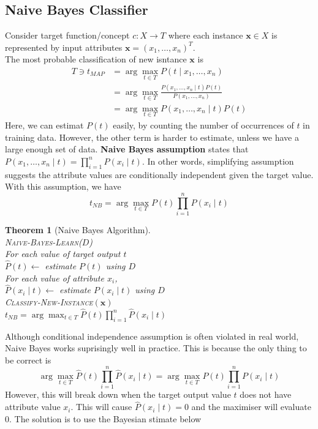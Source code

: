 \documentclass[12pt]{article}
\newcommand{\ind}{\hspace*{15pt}}
\newtheorem{theorem}{Theorem}[section]
\theoremstyle{definition}
\begin{document}
\subsection{Naive Bayes Classifier}
Consider target function/concept $c:X\to T$ where each instance $\mathbf{x}\in X$ is represented by input attributes $\mathbf{x}=(x_1,\ldots, x_n)^T$. \\
The most probable classification of new isntance $\mathbf{x}$ is
\begin{align*}
T\ni t_{MAP} &= \arg\max_{t\in T} P(t\mid x_1, \ldots, x_n)\\
&=\arg\max_{t\in T} \frac{P(x_1,\ldots, x_n\mid t)P(t)}{P(x_1, \ldots, x_n)}\\
&=\arg\max_{t\in T} P(x_1,\ldots, x_n\mid t)P(t)
\end{align*}
Here, we can estimat $P(t)$ easily, by counting the number of occurrences of $t$ in training data. However, the other term is harder to estimate, unless we have a large enough set of data.
\textbf{Naive Bayes assumption} states that $P(x_1, \ldots, x_n\mid t)=\prod_{i=1}^n P(x_i\mid t)$. In other words, simplifying assumption suggests the attribute values are conditionally independent given the target value. \\
With this assumption, we have
\[
t_{NB}=\arg\max_{t\in T}P(t)\prod_{i=1}^n P(x_i\mid t)
\]
\begin{theorem}[Naive Bayes Algorithm]
\hfill\\\normalfont 
\textsc{Naive-Bayes-Learn}($D$)\\
\ind For each value of target output $t$\\
\ind \ind $\hat{P}(t)\leftarrow$ estimate $P(t)$ using $D$\\
\ind \ind For each value of attribute $x_i$,\\
\ind \ind \ind $\hat{P}(x_i\mid t)\leftarrow$ estimate $P(x_i\mid t)$ using $D$\\
\textsc{Classify-New-Instance}$(\mathbf{x})$\\
\ind $t_{NB}=\arg\max_{t\in T}\hat{P}(t)\prod_{i=1}^n\hat{P}(x_i\mid t)$
\end{theorem}
Although conditional independence assumption is often violated in real world, Naive Bayes works suprisingly well in practice. This is because the only thing to be correct is
\[
\arg\max_{t\in T}\hat{P}(t)\prod_{i=1}^n \hat{P}(x_i\mid t)=\arg\max_{t\in T}P(t)\prod_{i=1}^n P(x_i\mid t)
\]
However, this will break down when the target output value $t$ does not have attribute value $x_i$. This will cause $\hat{P}(x_i\mid t)=0$ and the maximiser will evaluate $0$. The solution is to use the Bayesian stimate below
\end{document}
